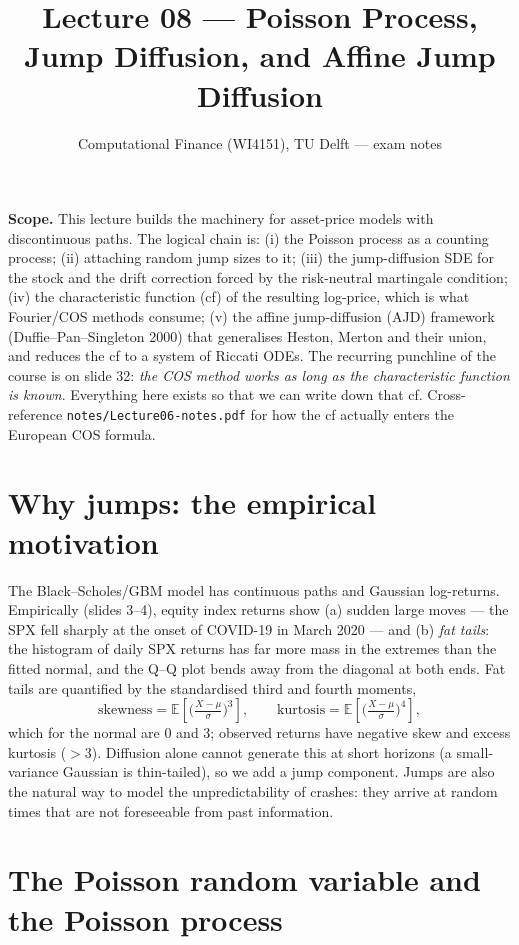 \documentclass[11pt]{article}
\title{Lecture 08 --- Poisson Process, Jump Diffusion, and Affine Jump Diffusion}
\author{Computational Finance (WI4151), TU Delft --- exam notes}
\date{}
\newcommand{\E}{\mathbb{E}}
\begin{document}
\maketitle

\noindent
\textbf{Scope.} This lecture builds the machinery for asset-price models with discontinuous paths.
The logical chain is: (i) the Poisson process as a counting process; (ii) attaching random jump
sizes to it; (iii) the jump-diffusion SDE for the stock and the drift correction forced by the
risk-neutral martingale condition; (iv) the characteristic function (cf) of the resulting log-price,
which is what Fourier/COS methods consume; (v) the affine jump-diffusion (AJD) framework
(Duffie--Pan--Singleton 2000) that generalises Heston, Merton and their union, and reduces the cf
to a system of Riccati ODEs. The recurring punchline of the course is on slide 32: \emph{the COS
method works as long as the characteristic function is known}. Everything here exists so that we can
write down that cf. Cross-reference \texttt{notes/Lecture06-notes.pdf} for how the cf actually
enters the European COS formula.

\section{Why jumps: the empirical motivation}
The Black--Scholes/GBM model has continuous paths and Gaussian log-returns. Empirically (slides 3--4),
equity index returns show (a) sudden large moves --- the SPX fell sharply at the onset of COVID-19 in
March 2020 --- and (b) \emph{fat tails}: the histogram of daily SPX returns has far more mass in the
extremes than the fitted normal, and the Q--Q plot bends away from the diagonal at both ends. Fat tails
are quantified by the standardised third and fourth moments,
\[
\text{skewness} = \E\!\left[\Big(\tfrac{X-\mu}{\sigma}\Big)^{3}\right], \qquad
\text{kurtosis}  = \E\!\left[\Big(\tfrac{X-\mu}{\sigma}\Big)^{4}\right],
\]
which for the normal are $0$ and $3$; observed returns have negative skew and excess kurtosis ($>3$).
Diffusion alone cannot generate this at short horizons (a small-variance Gaussian is thin-tailed), so
we add a jump component. Jumps are also the natural way to model the unpredictability of crashes: they
arrive at random times that are not foreseeable from past information.

\section{The Poisson random variable and the Poisson process}
\end{document}
